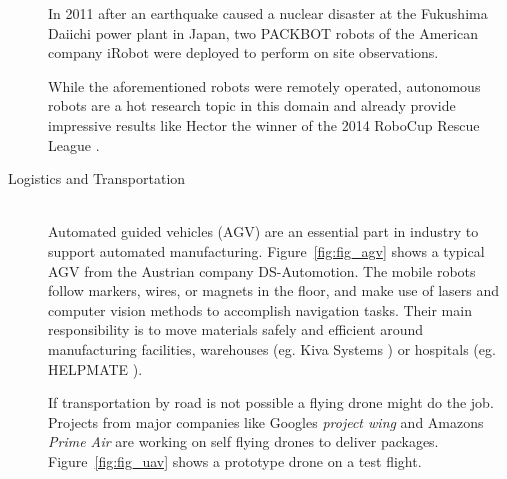 \begin{description}
In 2011 after an earthquake caused a nuclear disaster at the Fukushima Daiichi power plant in Japan, two PACKBOT robots of the American company iRobot were deployed to perform on site observations.

While the aforementioned robots were remotely operated, autonomous robots are a hot research topic in this domain and already provide impressive results like Hector the winner of the 2014 RoboCup Rescue League \cite{2014:hector_rescue_tdp}.

\item[Logistics and Transportation]\hfill \\
Automated guided vehicles (AGV) are an essential part in industry to support automated manufacturing. Figure~\ref{fig:fig_agv} shows a typical AGV from the Austrian company DS-Automotion.
The mobile robots follow markers, wires, or magnets in the floor, and make use of lasers and computer vision methods to accomplish navigation tasks. 
Their main responsibility is to move materials safely and efficient around manufacturing facilities, warehouses (eg. Kiva Systems \cite{kiva}) or hospitals (eg. HELPMATE \cite{ROB:4520696}). 

If transportation by road is not possible a flying drone might do the job. Projects from major companies like Googles \emph{project wing} and Amazons \emph{Prime Air} are working on self flying drones to deliver packages. 
Figure~\ref{fig:fig_uav} shows a prototype drone on a test flight. 


\end{description}
